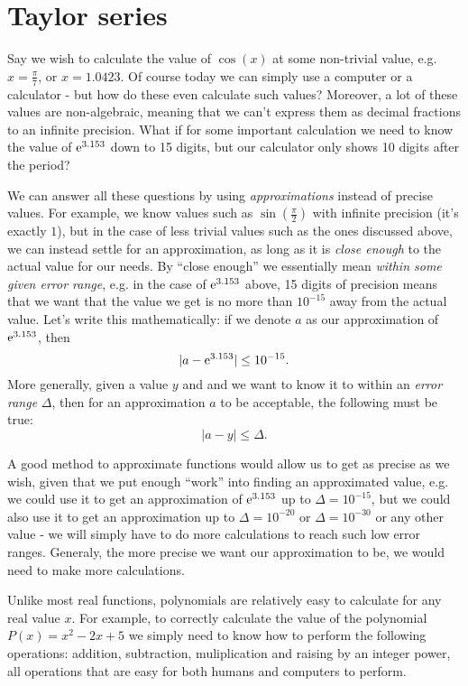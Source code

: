 \section{Taylor series}
Say we wish to calculate the value of $\cos(x)$ at some non-trivial value, e.g. $x=\frac{\pi}{7}$, or $x=1.0423$. Of course today we can simply use a computer or a calculator - but how do these even calculate such values? Moreover, a lot of these values are non-algebraic, meaning that we can't express them as decimal fractions to an infinite precision. What if for some important calculation we need to know the value of $\mathrm{e}^{3.153}$ down to 15 digits, but our calculator only shows 10 digits after the period?

We can answer all these questions by using \emph{approximations} instead of precise values. For example, we know values such as $\sin\left(\frac{\pi}{2}\right)$ with infinite precision (it's exactly $1$), but in the case of less trivial values such as the ones discussed above, we can instead settle for an approximation, as long as it is \textit{close enough} to the actual value for our needs. By ``close enough'' we essentially mean \textit{within some given error range}, e.g. in the case of $\mathrm{e}^{3.153}$ above, 15 digits of precision means that we want that the value we get is no more than $10^{-15}$ away from the actual value. Let's write this mathematically: if we denote $a$ as our approximation of $\mathrm{e}^{3.153}$, then
\[
  \lvert a-\mathrm{e}^{3.153}\rvert \leq 10^{-15}.
\]
More generally, given a value $y$ and and we want to know it to within an \emph{error range} $\Delta$, then for an approximation $a$ to be acceptable, the following must be true:
\begin{equation}
  \lvert a-y \rvert \leq \Delta.
  \label{eq:error_range}
\end{equation}

A good method to approximate functions would allow us to get as precise as we wish, given that we put enough ``work'' into finding an approximated value, e.g. we could use it to get an approximation of $\mathrm{e}^{3.153}$ up to $\Delta=10^{-15}$, but we could also use it to get an approximation up to $\Delta=10^{-20}$ or $\Delta=10^{-30}$ or any other value - we will simply have to do more calculations to reach such low error ranges. Generaly, the more precise we want our approximation to be, we would need to make more calculations.

Unlike most real functions, polynomials are relatively easy to calculate for any real value $x$. For example, to correctly calculate the value of the polynomial $P(x)=x^{2}-2x+5$ we simply need to know how to perform the following operations: addition, subtraction, muliplication and raising by an integer power, all operations that are easy for both humans and computers to perform.

